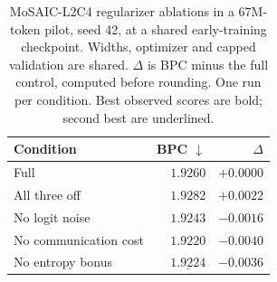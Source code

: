 \begin{table}[t]
\centering
\caption{MoSAIC-L2C4 regularizer ablations in a 67M-token pilot, seed 42, at a shared early-training checkpoint. Widths, optimizer and capped validation are shared. $\Delta$ is BPC minus the full control, computed before rounding. One run per condition. Best observed scores are bold; second best are underlined.}
\label{tab:ablation}
\begin{tabular}{lrr}
\toprule
Condition & BPC $\downarrow$ & $\Delta$ \\
\midrule
Full & $1.9260$ & $+0.0000$ \\
All three off & $1.9282$ & $+0.0022$ \\
No logit noise & $1.9243$ & $-0.0016$ \\
No communication cost & $\mathbf{1.9220}$ & $-0.0040$ \\
No entropy bonus & $\underline{1.9224}$ & $-0.0036$ \\
\bottomrule
\end{tabular}
\end{table}

